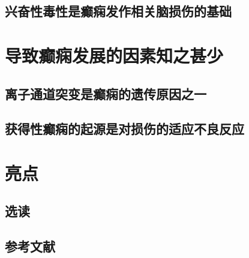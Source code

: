 \subsection{兴奋性毒性是癫痫发作相关脑损伤的基础}

\section{导致癫痫发展的因素知之甚少}
\subsection{离子通道突变是癫痫的遗传原因之一}
\subsection{获得性癫痫的起源是对损伤的适应不良反应}

\section{亮点}
\subsection{选读}
\subsection{参考文献}
